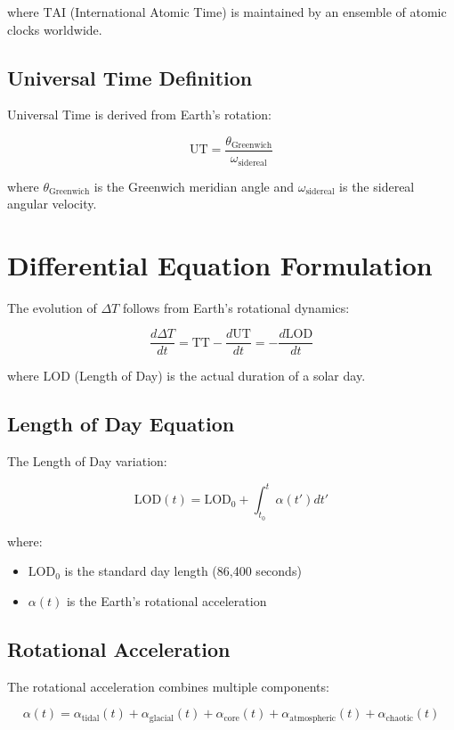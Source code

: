 \documentclass[12pt,a4paper]{report}
\newcommand{\TT}{\text{TT}}
\newcommand{\UT}{\text{UT}}
\newcommand{\TAI}{\text{TAI}}
\begin{document}
where $\TAI$ (International Atomic Time) is maintained by an ensemble of atomic clocks worldwide.

\subsection{Universal Time Definition}

Universal Time is derived from Earth's rotation:

\[
\UT = \frac{\theta_{\text{Greenwich}}}{\omega_{\text{sidereal}}}
\]

where $\theta_{\text{Greenwich}}$ is the Greenwich meridian angle and $\omega_{\text{sidereal}}$ is the sidereal angular velocity.

\section{Differential Equation Formulation}

The evolution of $\Delta T$ follows from Earth's rotational dynamics:

\[
\frac{d\Delta T}{dt} = \TT - \frac{d\UT}{dt} = -\frac{d\text{LOD}}{dt}
\]

where $\text{LOD}$ (Length of Day) is the actual duration of a solar day.

\subsection{Length of Day Equation}

The Length of Day variation:

\[
\text{LOD}(t) = \text{LOD}_0 + \int_{t_0}^{t} \alpha(t') dt'
\]

where:
\begin{itemize}
\item $\text{LOD}_0$ is the standard day length (86,400 seconds)
\item $\alpha(t)$ is the Earth's rotational acceleration
\end{itemize}

\subsection{Rotational Acceleration}

The rotational acceleration combines multiple components:

\[
\alpha(t) = \alpha_{\text{tidal}}(t) + \alpha_{\text{glacial}}(t) + \alpha_{\text{core}}(t) + \alpha_{\text{atmospheric}}(t) + \alpha_{\text{chaotic}}(t)
\]
\end{document}
